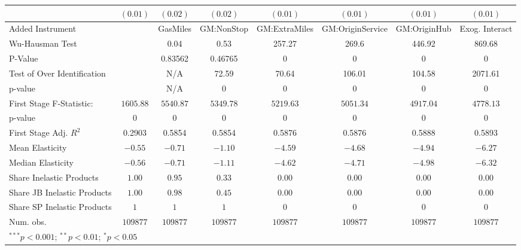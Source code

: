 \begin{tabular}{l c c c c c c c}
                             & $(0.01)$      & $(0.02)$      & $(0.02)$      & $(0.01)$      & $(0.01)$         & $(0.01)$      & $(0.01)$       \\
\midrule
Added Instrument             &               & GasMiles      & GM:NonStop    & GM:ExtraMiles & GM:OriginService & GM:OriginHub  & Exog. Interact \\
Wu-Hausman Test              &               & 0.04          & 0.53          & 257.27        & 269.6            & 446.92        & 869.68         \\
P-Value                      &               & 0.83562       & 0.46765       & 0             & 0                & 0             & 0              \\
Test of Over Identification  &               & N/A           & 72.59         & 70.64         & 106.01           & 104.58        & 2071.61        \\
p-value                      &               & N/A           & 0             & 0             & 0                & 0             & 0              \\
First Stage F-Statistic:     & $1605.88$     & $5540.87$     & $5349.78$     & $5219.63$     & $5051.34$        & $4917.04$     & $4778.13$      \\
p-value                      & $0$           & $0$           & $0$           & $0$           & $0$              & $0$           & $0$            \\
First Stage Adj. $R^2$       & 0.2903        & 0.5854        & 0.5854        & 0.5876        & 0.5876           & 0.5888        & 0.5893         \\
Mean Elasticity              & $-0.55$       & $-0.71$       & $-1.10$       & $-4.59$       & $-4.68$          & $-4.94$       & $-6.27$        \\
Median Elasticity            & $-0.56$       & $-0.71$       & $-1.11$       & $-4.62$       & $-4.71$          & $-4.98$       & $-6.32$        \\
Share Inelastic Products     & $1.00$        & $0.95$        & $0.33$        & $0.00$        & $0.00$           & $0.00$        & $0.00$         \\
Share JB Inelastic Products  & $1.00$        & $0.98$        & $0.45$        & $0.00$        & $0.00$           & $0.00$        & $0.00$         \\
Share SP Inelastic Products  & $1$           & $1$           & $1$           & $0$           & $0$              & $0$           & $0$            \\
Num. obs.                    & $109877$      & $109877$      & $109877$      & $109877$      & $109877$         & $109877$      & $109877$       \\
\bottomrule
\multicolumn{8}{l}{\scriptsize{$^{***}p<0.001$; $^{**}p<0.01$; $^{*}p<0.05$}}
\end{tabular}
